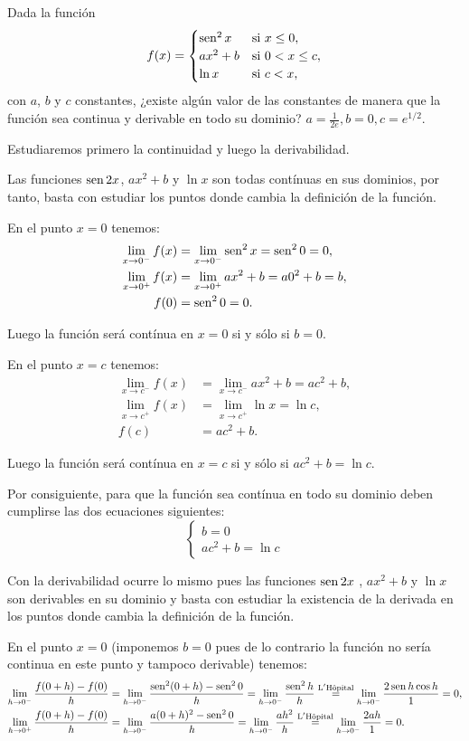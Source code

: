 {Dada la función
\[ 
f(x)=
\begin{cases}
\operatorname{sen}^2x & \mbox{si $x\leq 0$},  \\
ax^2+b &  \mbox{si $0<x\leq c$},  \\
\ln x &  \mbox{si $c<x$},
\end{cases}
\]
con $a$, $b$ y $c$ constantes, ¿existe algún valor de las constantes de manera que la función sea continua y derivable en todo su dominio?
}
{$a=\frac{1}{2e}, b=0, c=e^{1/2}.$
}
{Estudiaremos primero la continuidad y luego la derivabilidad.

Las funciones $\operatorname{sen} 2x$, $ax^2+b$ y $\ln x$ son todas contínuas en sus dominios, por tanto, basta con estudiar los puntos donde cambia la definici\'{o}n de la funci\'{o}n.

En el punto $x=0$ tenemos: 
\begin{align*}
\lim_{x\rightarrow 0^{-}}f(x) &= \lim_{x\rightarrow 0^{-}}\operatorname{sen}^2x=\operatorname{sen}^20=0, \\
\lim_{x\rightarrow 0^{+}}f(x) &= \lim_{x\rightarrow 0^{+}}ax^2+b=a0^2+b=b, \\
f(0) &= \operatorname{sen}^20=0.
\end{align*}

Luego la función será contínua en $x=0$ si y sólo si $b=0$.

En el punto $x=c$ tenemos: 
\begin{align*}
\lim_{x\rightarrow c^{-}}f(x) &= \lim_{x\rightarrow c^{-}}ax^2+b=ac^2+b, \\
\lim_{x\rightarrow c^{+}}f(x) &= \lim_{x\rightarrow c^{+}}\ln x=\ln c, \\
f(c) &= ac^2+b.
\end{align*}

Luego la función será contínua en $x=c$ si y sólo si $ac^2+b=\ln c$.

Por consiguiente, para que la función sea contínua en todo su dominio deben cumplirse las dos ecuaciones siguientes: 
\[
\begin{cases}
b=0 \\ 
ac^2+b = \ln c
\end{cases}
\]

Con la derivabilidad ocurre lo mismo pues las funciones $\operatorname{sen} 2x$ , $ax^2+b$ y $\ln x$ son derivables en su dominio y basta con estudiar la existencia de la derivada en los puntos donde cambia la definición de la función.

En el punto $x=0$ (imponemos $b=0$ pues de lo contrario la función no sería continua en este punto y tampoco derivable) tenemos: 
\begin{align*}
\lim_{h\rightarrow 0^{-}}\frac{f(0+h)-f(0)}{h} &= \lim_{h\rightarrow 0^{-}}\frac{\operatorname{sen}^2(0+h)-\operatorname{sen}^20}{h} = \lim_{h\rightarrow 0^{-}}\frac{\operatorname{sen}^2h}{h}\stackrel{\text{L}^{\prime }\text{H\^{o}pital}}{=}\lim_{h\rightarrow 0^{-}}\frac{2\operatorname{sen} h\cos h}{1}=0, \\
\lim_{h\rightarrow 0^{+}}\frac{f(0+h)-f(0)}{h} &= \lim_{h\rightarrow 0^{-}}\frac{a(0+h)^2-\operatorname{sen}^20}{h}=\lim_{h\rightarrow 0^{-}}\frac{ah^2}h\stackrel{\text{L}^{\prime }\text{H\^{o}pital}}{=}\lim_{h\rightarrow 0^{-}}\frac{2ah}{1}=0.
\end{align*}

}
